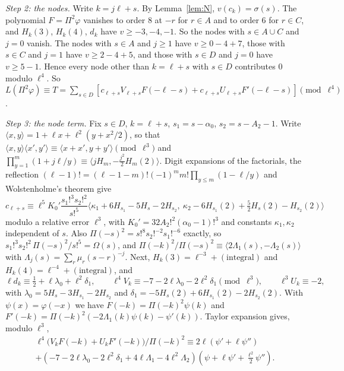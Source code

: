\documentclass[11pt]{amsart}
\theoremstyle{definition}
\theoremstyle{remark}
\numberwithin{equation}{section}
\begin{document}
\emph{Step 2: the nodes.} Write $k=j\ell+s$. By Lemma~\ref{lem:N}, $v(c_k)=\sigma(s)$. The polynomial $F=\Pi^2\varphi$ vanishes to order $8$ at $-r$ for $r\in A$ and to order $6$ for $r\in C$, and $H_k(3)$, $H_k(4)$, $d_k$ have $v\ge-3,-4,-1$. So the nodes with $s\in A\cup C$ and $j=0$ vanish. The nodes with $s\in A$ and $j\ge1$ have $v\ge0-4+7$, those with $s\in C$ and $j=1$ have $v\ge2-4+5$, and those with $s\in D$ and $j=0$ have $v\ge5-1$. Hence every node other than $k=\ell+s$ with $s\in D$ contributes $0$ modulo $\ell^4$.
So $L(\Pi^2\varphi)\equiv T=\sum_{s\in D}[c_{\ell+s}V_{\ell+s}F(-\ell-s)+c_{\ell+s}U_{\ell+s}F'(-\ell-s)]\pmod{\ell^4}$.

\emph{Step 3: the node term.} Fix $s\in D$, $k=\ell+s$, $s_1=s-\alpha_0$, $s_2=s-A_2-1$. Write
$\langle x,y\rangle=1+\ell x+\ell^2(y+x^2/2)$, so that $\langle x,y\rangle\langle x',y'\rangle\equiv\langle x+x',y+y'\rangle\pmod{\ell^3}$ and
$\prod_{y=1}^{m}(1+j\ell/y)\equiv\langle jH_m,-\frac{j^2}2H_m(2)\rangle$. Digit expansions of the factorials, the reflection
$(\ell-1)!=(\ell-1-m)!(-1)^mm!\prod_{y\le m}(1-\ell/y)$ and Wolstenholme's theorem give
\[
 c_{\ell+s}\equiv\ell^5K_0'\frac{s_1!^3s_2!^2}{s!^5}\bigl\langle\kappa_1+6H_{s_1}-5H_s-2H_{s_2},\ \kappa_2-6H_{s_1}(2)+\tfrac52H_s(2)-H_{s_2}(2)\bigr\rangle
\]
modulo a relative error $\ell^3$, with $K_0'=32A_2!^2(\alpha_0-1)!^3$ and constants $\kappa_1,\kappa_2$ independent of $s$. Also
$\Pi(-s)^2=s!^8s_2!^{-2}s_1!^{-6}$ exactly, so $s_1!^3s_2!^2\,\Pi(-s)^2/s!^5=\Omega(s)$, and
$\Pi(-k)^2/\Pi(-s)^2\equiv\langle2\Lambda_1(s),-\Lambda_2(s)\rangle$ with $\Lambda_j(s)=\sum_r\mu_r(s-r)^{-j}$. Next, $H_k(3)=\ell^{-3}+(\text{integral})$ and
$H_k(4)=\ell^{-4}+(\text{integral})$, and
\[
 \ell d_k\equiv\tfrac12+\ell\lambda_0+\ell^2\delta_1,\qquad \ell^4V_k\equiv-7-2\ell\lambda_0-2\ell^2\delta_1\pmod{\ell^3},\qquad \ell^3U_k\equiv-2,
\]
with $\lambda_0=5H_s-3H_{s_1}-2H_{s_2}$ and $\delta_1=-5H_s(2)+6H_{s_1}(2)-2H_{s_2}(2)$. With $\psi(x)=\varphi(-x)$ we have
$F(-k)=\Pi(-k)^2\psi(k)$ and $F'(-k)=\Pi(-k)^2(-2\Lambda_1(k)\psi(k)-\psi'(k))$. Taylor expansion gives, modulo $\ell^3$,
\begin{multline*}
 \ell^4\bigl(V_kF(-k)+U_kF'(-k)\bigr)/\Pi(-k)^2\equiv2\ell(\psi'+\ell\psi'')\\
 +(-7-2\ell\lambda_0-2\ell^2\delta_1+4\ell\Lambda_1-4\ell^2\Lambda_2)(\psi+\ell\psi'+\tfrac{\ell^2}2\psi'').
\end{multline*}
\end{document}
